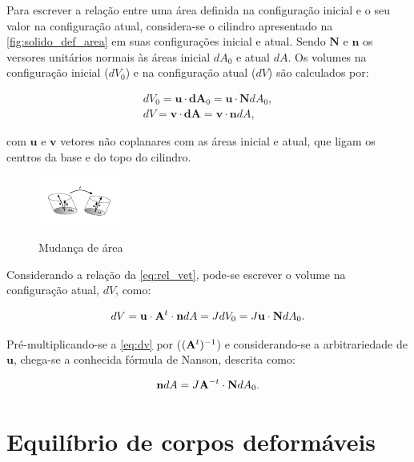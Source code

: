 Para escrever a relação entre uma área definida na configuração inicial e o seu valor na configuração atual, considera-se o cilindro apresentado na \autoref{fig:solido_def_area} em suas configurações inicial e atual. Sendo $\mathbf{N}$ e $\mathbf{n}$ os versores unitários normais às áreas inicial $dA_{0}$ e atual $dA$. Os volumes na configuração inicial ($dV_{0}$) e na configuração atual ($dV$) são calculados por:

\begin{align}
dV_{0} = \mathbf{u} \cdot \mathbf{dA}_{0} = \mathbf{u} \cdot \mathbf{N} dA_0 ,\\
dV = \mathbf{v} \cdot \mathbf{dA} = \mathbf{v} \cdot \mathbf{n} dA \label{eq:vol_func_area},
\end{align}

\noindent com $\mathbf{u}$ e $\mathbf{v}$ vetores não coplanares com as áreas inicial e atual, que ligam os centros da base e do topo do cilindro.

\begin{figure}[!htbp]
	\caption{Mudança de área}
	\centering
	\includegraphics[scale=6.0,trim=0cm 0.2cm 0cm 0cm, clip=true]{Imagens/Cap4/sol_def_area.pdf}	
	\label{fig:solido_def_area}
\end{figure}

Considerando a relação da \autoref{eq:rel_vet}, pode-se escrever o volume na configuração atual, $dV$, como:

\begin{align}
	dV = \mathbf{u} \cdot \mathbf{A}^{t} \cdot \mathbf{n} dA = J dV_0 = J \mathbf{u} \cdot \mathbf{N} dA_0. \label{eq:dv}
\end{align}

Pré-multiplicando-se a \autoref{eq:dv} por ($(\mathbf{A}^{t})^{-1}$) e considerando-se a arbitrariedade de $\mathbf{u}$, chega-se a conhecida fórmula de Nanson, descrita como:

\begin{align}
\mathbf{n}dA = J \mathbf{A}^{-t} \cdot \mathbf{N} dA_{0}. \label{eq:Nanson}
\end{align}


\section{Equilíbrio de corpos deformáveis} \label{capitulo:Cap3:EquilibrioCorposDeformaveis}

